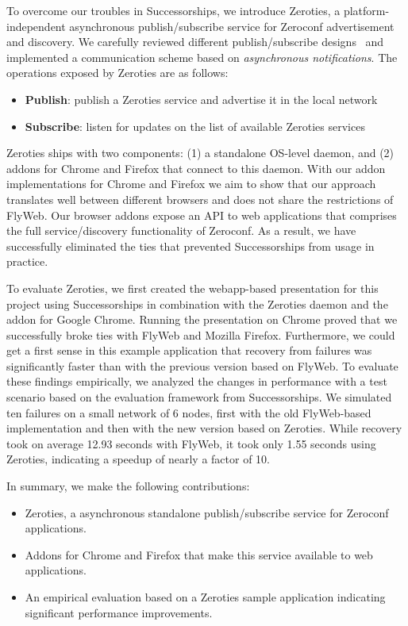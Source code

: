 To overcome our troubles in Successorships, we introduce Zeroties, a platform-independent asynchronous publish/subscribe service for Zeroconf advertisement and discovery.
We carefully reviewed different publish/subscribe designs~\cite{eugster_2003} and implemented a communication scheme based on \textit{asynchronous notifications}.
The operations exposed by Zeroties are as follows:
\begin{itemize}
    \item \textbf{Publish}: publish a Zeroties service and advertise it in the local network
    \item \textbf{Subscribe}: listen for updates on the list of available Zeroties services
\end{itemize}

Zeroties ships with two components: (1) a standalone OS-level daemon, and (2) addons for Chrome and Firefox that connect to this daemon.
With our addon implementations for Chrome and Firefox we aim to show that our approach translates well between different browsers and does not share the restrictions of FlyWeb.
Our browser addons expose an API to web applications that comprises the full service/discovery functionality of Zeroconf.
As a result, we have successfully eliminated the ties that prevented Successorships from usage in practice.

To evaluate Zeroties, we first created the webapp-based presentation for this project using Successorships in combination with the Zeroties daemon and the addon for Google Chrome.
Running the presentation on Chrome proved that we successfully broke ties with FlyWeb and Mozilla Firefox.
Furthermore, we could get a first sense in this example application that recovery from failures was significantly faster than with the previous version based on FlyWeb.
To evaluate these findings empirically, we analyzed the changes in performance with a test scenario based on the evaluation framework from Successorships.
We simulated ten failures on a small network of 6 nodes, first with the old FlyWeb-based implementation and then with the new version based on Zeroties.
While recovery took on average 12.93 seconds with FlyWeb, it took only 1.55 seconds using Zeroties, indicating a speedup of nearly a factor of 10.

In summary, we make the following contributions:
\begin{itemize}
    \item Zeroties, a asynchronous standalone publish/subscribe service for Zeroconf applications.
    \item Addons for Chrome and Firefox that make this service available to web applications.
    \item An empirical evaluation based on a Zeroties sample application indicating significant performance improvements.
\end{itemize}

